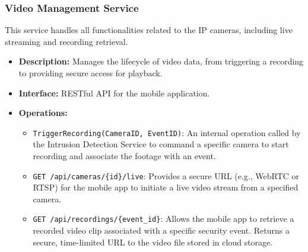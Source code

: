 \documentclass[conference]{IEEEtran}
\begin{document}
\subsubsection{Video Management Service}
This service handles all functionalities related to the IP cameras, including live streaming and recording retrieval.
\begin{itemize}
    \item \textbf{Description:} Manages the lifecycle of video data, from triggering a recording to providing secure access for playback.
    \item \textbf{Interface:} RESTful API for the mobile application.
    \item \textbf{Operations:}
    \begin{itemize}
        \item \texttt{TriggerRecording(CameraID, EventID)}: An internal operation called by the Intrusion Detection Service to command a specific camera to start recording and associate the footage with an event.
        \item \texttt{GET /api/cameras/\{id\}/live}: Provides a secure URL (e.g., WebRTC or RTSP) for the mobile app to initiate a live video stream from a specified camera.
        \item \texttt{GET /api/recordings/\{event\_id\}}: Allows the mobile app to retrieve a recorded video clip associated with a specific security event. Returns a secure, time-limited URL to the video file stored in cloud storage.
    \end{itemize}
\end{itemize}

\end{document}
